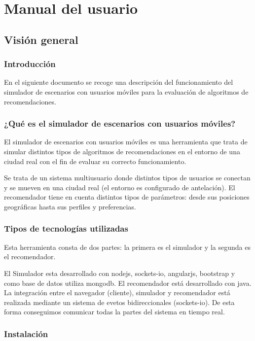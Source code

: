 \chapter{Manual del usuario}

\section{Visión general}

\subsection{Introducción}

En el siguiente documento se recoge una descripción del funcionamiento del simulador de escenarios con usuarios móviles para la evaluación de algoritmos de recomendaciones.

\subsection{¿Qué es el simulador de escenarios con usuarios móviles?}

El simulador de escenarios con usuarios móviles es una herramienta que trata de simular distintos tipos de algoritmos de recomendaciones en el entorno de una ciudad real con el fin de evaluar su correcto funcionamiento.

Se trata de un sistema multiusuario donde distintos tipos de usuarios se conectan y se mueven en una ciudad real (el entorno es configurado de antelación). El recomendador tiene en cuenta distintos tipos de parámetros: desde sus posiciones geográficas hasta sus perfiles y preferencias.

\subsection{Tipos de tecnologías utilizadas}

Esta herramienta consta de dos partes: la primera es el simulador y la segunda es el recomendador.

El Simulador esta desarrollado con nodejs, sockets-io, angularjs, bootstrap y como base de datos utiliza mongodb. El recomendador está desarrollado con java. La integración entre el navegador (cliente), simulador y recomendador está realizada mediante un sistema de evetos bidireccionales (sockets-io). De esta forma conseguimos comunicar todas la partes del sistema en tiempo real.

\subsection{Instalación}

